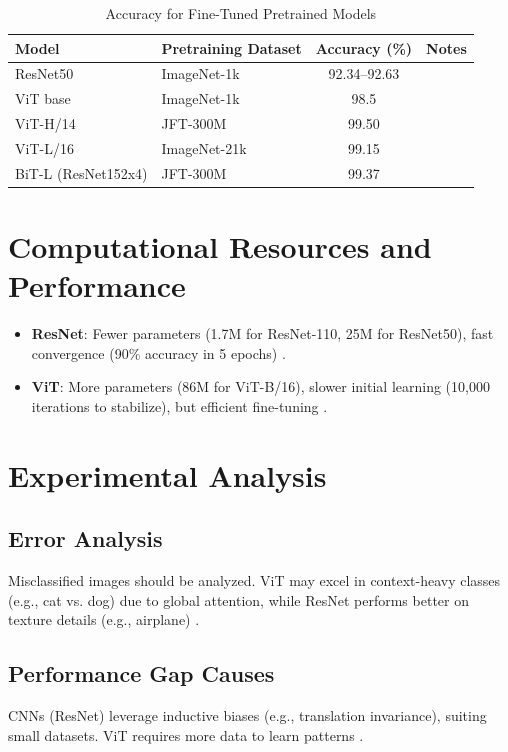 \documentclass[UTF8]{report}
\theoremstyle{MyLineTheoremStyle} %
\theoremstyle{MyBlockTheoremStyle} %
\theoremstyle{MySubsubsectionStyle} %
\begin{document}
\begin{table}[h]
\centering
\caption{Accuracy for Fine-Tuned Pretrained Models}
\begin{tabular}{llcc}
\toprule
Model & Pretraining Dataset & Accuracy (\%) & Notes \\
\midrule
ResNet50 & ImageNet-1k & 92.34–92.63 & \cite{sidthoviti} \\
ViT base & ImageNet-1k & 98.5 & \cite{kentaroy47vit} \\
ViT-H/14 & JFT-300M & 99.50 & \cite{dosovitskiy2020image} \\
ViT-L/16 & ImageNet-21k & 99.15 & \cite{dosovitskiy2020image} \\
BiT-L (ResNet152x4) & JFT-300M & 99.37 & \cite{dosovitskiy2020image} \\
\bottomrule
\end{tabular}
\end{table}

\section*{Computational Resources and Performance}
\begin{itemize}
    \item \textbf{ResNet}: Fewer parameters (1.7M for ResNet-110, 25M for ResNet50), fast convergence (90\% accuracy in 5 epochs) \cite{pytorchforum}.
    \item \textbf{ViT}: More parameters (86M for ViT-B/16), slower initial learning (10,000 iterations to stabilize), but efficient fine-tuning \cite{lightningvit, dosovitskiy2020image}.
\end{itemize}

\section*{Experimental Analysis}
\subsection*{Error Analysis}
Misclassified images should be analyzed. ViT may excel in context-heavy classes (e.g., cat vs. dog) due to global attention, while ResNet performs better on texture details (e.g., airplane) \cite{kentaroy47vit}.

\subsection*{Performance Gap Causes}
CNNs (ResNet) leverage inductive biases (e.g., translation invariance), suiting small datasets. ViT requires more data to learn patterns \cite{lightningvit}.
\end{document}
